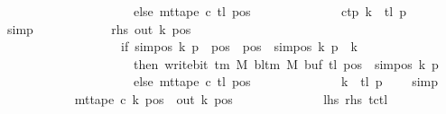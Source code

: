 \begin{isabellebody}
\ \ \ \ \ \ \ \ \ \ \ \ \ \ \ \ \ \ \ \ \ else\ mt{\isacharunderscore}{\kern0pt}tape\ c{}\ {\isacharquery}{\kern0pt}tl\ pos{\isacharparenright}{\kern0pt}{\isachardoublequoteclose}\isanewline
\ \ \ \ \ \ \ \ \ \ \ \ \isamarkupfalse%
\ c{}{\isacharunderscore}{\kern0pt}tp\ {\isacartoucheopen}k\ {\isacharequal}{\kern0pt}\ {\isacharquery}{\kern0pt}tl{\isacartoucheclose}\ {\isacartoucheopen}{\isacharquery}{\kern0pt}p\ {\isasymnoteq}\ {}{\isacartoucheclose}\ \isamarkupfalse%
\ simp\isanewline
\ \ \ \ \ \ \ \ \ \ \isamarkupfalse%
\ rhs{\isacharcolon}{\kern0pt}\ {\isachardoublequoteopen}{\isacharquery}{\kern0pt}out\ k\ pos\isanewline
\ \ \ \ \ \ \ \ \ \ \ \ \ \ \ \ \ \ {\isacharequal}{\kern0pt}\ {\isacharparenleft}{\kern0pt}if\ sim{\isacharunderscore}{\kern0pt}pos\ {\isacharquery}{\kern0pt}k\ {\isacharquery}{\kern0pt}p\ {\isasymle}\ pos\ {\isasymand}\ pos\ {\isacharless}{\kern0pt}\ sim{\isacharunderscore}{\kern0pt}pos\ {\isacharquery}{\kern0pt}k\ {\isacharquery}{\kern0pt}p\ {\isacharplus}{\kern0pt}\ {\isacharquery}{\kern0pt}k\isanewline
\ \ \ \ \ \ \ \ \ \ \ \ \ \ \ \ \ \ \ \ \ then\ write{\isacharunderscore}{\kern0pt}bit\ {\isacharparenleft}{\kern0pt}{\isasymGamma}{\isacharunderscore}{\kern0pt}tm\ M{\isacharparenright}{\kern0pt}\ {\isacharparenleft}{\kern0pt}bl{\isacharunderscore}{\kern0pt}tm\ M{\isacharparenright}{\kern0pt}\ {\isacharparenleft}{\kern0pt}buf\ {\isacharquery}{\kern0pt}tl{\isacharparenright}{\kern0pt}\ {\isacharparenleft}{\kern0pt}pos\ {\isacharminus}{\kern0pt}\ sim{\isacharunderscore}{\kern0pt}pos\ {\isacharquery}{\kern0pt}k\ {\isacharquery}{\kern0pt}p{\isacharparenright}{\kern0pt}\isanewline
\ \ \ \ \ \ \ \ \ \ \ \ \ \ \ \ \ \ \ \ \ else\ mt{\isacharunderscore}{\kern0pt}tape\ c{}\ {\isacharquery}{\kern0pt}tl\ pos{\isacharparenright}{\kern0pt}{\isachardoublequoteclose}\isanewline
\ \ \ \ \ \ \ \ \ \ \ \ \isamarkupfalse%
\ {\isacartoucheopen}k\ {\isacharequal}{\kern0pt}\ {\isacharquery}{\kern0pt}tl{\isacartoucheclose}\ {\isacartoucheopen}{\isacharquery}{\kern0pt}p\ {\isasymnoteq}\ {}{\isacartoucheclose}\ \isamarkupfalse%
\ simp\isanewline
\ \ \ \ \ \ \ \ \ \ \isamarkupfalse%
\ {\isachardoublequoteopen}mt{\isacharunderscore}{\kern0pt}tape\ c{}\ k\ pos\ {\isacharequal}{\kern0pt}\ {\isacharquery}{\kern0pt}out\ k\ pos{\isachardoublequoteclose}\isanewline
\ \ \ \ \ \ \ \ \ \ \ \ \isamarkupfalse%
\ lhs\ rhs\ tc{\isacharunderscore}{\kern0pt}tl\ \isamarkupfalse%

\end{isabellebody}
